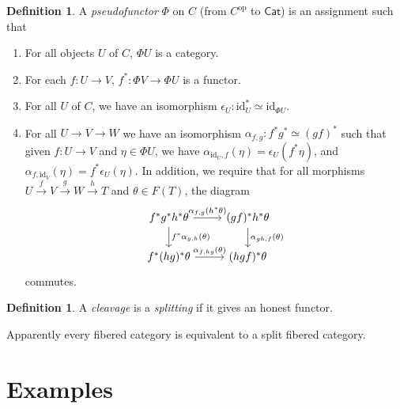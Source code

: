 \documentclass[leqno, openany]{memoir}
\theoremstyle{definition}
\newtheorem{defn}[thm]{Definition}
\theoremstyle{remark}
\theoremstyle{plain}
\theoremstyle{definition}
\theoremstyle{remark}
\newcommand{\mr}[1]{\mathrm{#1}}
\newcommand{\ms}[1]{\mathsf{#1}}
\begin{document}
\begin{defn} A \textit{pseudofunctor} $\Phi$ on $C$ (from $C^{\mr{op}}$ to
    $\ms{Cat}$) is an assignment such that \begin{enumerate} \item For all
        objects $U$ of $C$, $\Phi U$ is a category.  \item For each $f \colon U
        \to V$, $f^* \colon \Phi V \to \Phi U$ is a functor.  \item For all $U$
        of $C$, we have an isomorphism $\epsilon_U \colon \mr{id}^*_U \simeq
        \mr{id}_{\Phi U}$.  \item For all $U \to V \to W$ we have an
        isomorphism $\alpha_{f,g} \colon f^* g^* \simeq (gf)^*$ such that given
        $f \colon U \to V$ and $\eta \in \Phi U$, we have $\alpha_{\mr{id}_U,
        f}(\eta) = \epsilon_U(f^* \eta)$, and $\alpha_{f, \mr{id}_V}(\eta) =
        f^* \epsilon_U(\eta)$. In addition, we require that for all morphisms
        $U \xrightarrow{f} V \xrightarrow{g} W \xrightarrow{h} T$ and $\theta
        \in F(T)$, the diagram \begin{equation*} \begin{tikzcd} f^* g^* h^*
            \theta \arrow{r}{\alpha_{f,g}(h^* \theta)} \arrow{d}{f^*
            \alpha_{g,h}(\theta)} & (gf)^* h^* \theta
            \arrow{d}{\alpha_{gh,f}(\theta)} \\ f^*(hg)^* \theta
            \arrow{r}{\alpha_{f,hg}(\theta)} & (hgf)^* \theta \end{tikzcd}
    \end{equation*} commutes.  \end{enumerate} \end{defn}

\begin{defn} A \textit{cleavage} is a \textit{splitting} if it gives an honest
functor.  \end{defn}

Apparently every fibered category is equivalent to a split fibered category.

\section{Examples}%
\end{document}
